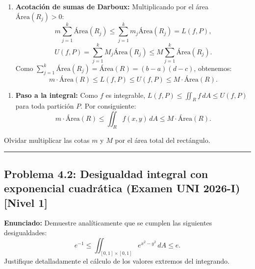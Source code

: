 \documentclass[11pt,a4paper]{article}
\begin{document}
\begin{enumerate}[label=\textbf{\arabic*.}]
\item \textbf{Acotación de sumas de Darboux:}
Multiplicando por el área $\text{Área}(R_j) > 0$:
\begin{equation*}
m \sum_{j=1}^k \text{Área}(R_j) \le \sum_{j=1}^k m_j \text{Área}(R_j) = L(f, P),
\end{equation*}
\begin{equation*}
U(f, P) = \sum_{j=1}^k M_j \text{Área}(R_j) \le M \sum_{j=1}^k \text{Área}(R_j).
\end{equation*}
Como $\sum_{j=1}^k \text{Área}(R_j) = \text{Área}(R) = (b-a)(d-c)$, obtenemos:
\begin{equation*}
m \cdot \text{Área}(R) \le L(f, P) \le U(f, P) \le M \cdot \text{Área}(R).
\end{equation*}
\end{enumerate}

\begin{enumerate}[label=\textbf{\arabic*.}]
\item \textbf{Paso a la integral:}
Como $f$ es integrable, $L(f, P) \le \iint_R f \, dA \le U(f, P)$ para toda partición $P$.
Por consiguiente:
\begin{equation*}
m \cdot \text{Área}(R) \le \iint_R f(x,y) \, dA \le M \cdot \text{Área}(R).
\end{equation*}
\end{enumerate}

\begin{trapbox}
Olvidar multiplicar las cotas $m$ y $M$ por el área total del rectángulo.
\end{trapbox}

\vspace{0.5cm}
\hrule
\vspace{0.5cm}

\subsection*{Problema 4.2: Desigualdad integral con exponencial cuadrática (Examen UNI 2026-I) \hfill \color{primaryblue}\small[Nivel 1]}

\begin{tcolorbox}[colback=white,colframe=gray!40,arc=1mm,boxrule=0.5pt,left=3mm,right=3mm,top=2mm,bottom=2mm]
\textbf{Enunciado:} Demuestre analíticamente que se cumplen las siguientes desigualdades:
\begin{equation*}
e^{-1} \le \iint_{[0,1] \times [0,1]} e^{x^2 - y^2} \, dA \le e.
\end{equation*}
Justifique detalladamente el cálculo de los valores extremos del integrando.
\end{tcolorbox}
\end{document}

